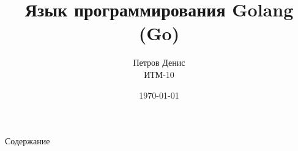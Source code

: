 \documentclass[10pt,pdf,hyperref={unicode}]{beamer}
\title{Язык программирования Golang (Go)}
\author{Петров Денис \\ ИТМ-10}
\date{\today}
\institute{СарФТИ}
\begin{document}
\maketitle
\begin{frame}{Содержание}
\tableofcontents
\end{frame}

\end{document}
